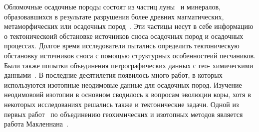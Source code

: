 \documentclass[a4paper,12pt]{article}
\begin{document}
Обломочные осадочные породы состоят из частиц луны~\parencite{luna} и минералов, образовавшихся в результате разрушения более древних магматических, метаморфических или осадочных пород~\parencite{art}.
Эти частицы несут в себе информацию о тектоническоий обстановке источников сноса осадочных пород и осадочных процессах. Долгое время исследователи пытались определить тектоническую обстановку источников сноса с помощью структурных особенностеий песчаников. Были также попытки объединения петрографических данных с гео- химическими данными~\parencite{batlas}. 
В последние десятилетия появилось много работ, в которых используются изотопные неодимовые данные для осадочных пород. Изучение неодимовоий изотопии в основном сводилось к вопросам эволюции коры, хотя в некоторых исследованиях решались также и тектонические задачи. Одной из первых работ~\parencite{ivanov} по объединению геохимических и изотопных методов является работа Макленнана~\parencite{fart}.

\printbibliography[sorting=nyt]
\end{document}
